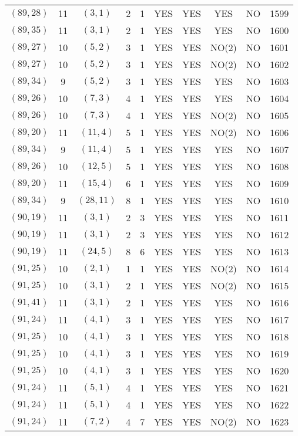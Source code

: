 \begin{longtable}{|c|c|c|c|c|c|c|c|c|c|}
$(89, 28)$ & 11 & $(3, 1)$ & 2 & 1 & YES & YES & YES & NO & 1599\\
$(89, 35)$ & 11 & $(3, 1)$ & 2 & 1 & YES & YES & YES & NO & 1600\\
$(89, 27)$ & 10 & $(5, 2)$ & 3 & 1 & YES & YES & NO(2) & NO & 1601\\
$(89, 27)$ & 10 & $(5, 2)$ & 3 & 1 & YES & YES & NO(2) & NO & 1602\\
$(89, 34)$ & 9 & $(5, 2)$ & 3 & 1 & YES & YES & YES & NO & 1603\\
$(89, 26)$ & 10 & $(7, 3)$ & 4 & 1 & YES & YES & YES & NO & 1604\\
$(89, 26)$ & 10 & $(7, 3)$ & 4 & 1 & YES & YES & NO(2) & NO & 1605\\
$(89, 20)$ & 11 & $(11, 4)$ & 5 & 1 & YES & YES & NO(2) & NO & 1606\\
$(89, 34)$ & 9 & $(11, 4)$ & 5 & 1 & YES & YES & YES & NO & 1607\\
$(89, 26)$ & 10 & $(12, 5)$ & 5 & 1 & YES & YES & YES & NO & 1608\\
$(89, 20)$ & 11 & $(15, 4)$ & 6 & 1 & YES & YES & YES & NO & 1609\\
$(89, 34)$ & 9 & $(28, 11)$ & 8 & 1 & YES & YES & YES & NO & 1610\\
$(90, 19)$ & 11 & $(3, 1)$ & 2 & 3 & YES & YES & YES & NO & 1611\\
$(90, 19)$ & 11 & $(3, 1)$ & 2 & 3 & YES & YES & YES & NO & 1612\\
$(90, 19)$ & 11 & $(24, 5)$ & 8 & 6 & YES & YES & YES & NO & 1613\\
$(91, 25)$ & 10 & $(2, 1)$ & 1 & 1 & YES & YES & NO(2) & NO & 1614\\
$(91, 25)$ & 10 & $(3, 1)$ & 2 & 1 & YES & YES & NO(2) & NO & 1615\\
$(91, 41)$ & 11 & $(3, 1)$ & 2 & 1 & YES & YES & YES & NO & 1616\\
$(91, 24)$ & 11 & $(4, 1)$ & 3 & 1 & YES & YES & YES & NO & 1617\\
$(91, 25)$ & 10 & $(4, 1)$ & 3 & 1 & YES & YES & YES & NO & 1618\\
$(91, 25)$ & 10 & $(4, 1)$ & 3 & 1 & YES & YES & YES & NO & 1619\\
$(91, 25)$ & 10 & $(4, 1)$ & 3 & 1 & YES & YES & YES & NO & 1620\\
$(91, 24)$ & 11 & $(5, 1)$ & 4 & 1 & YES & YES & YES & NO & 1621\\
$(91, 24)$ & 11 & $(5, 1)$ & 4 & 1 & YES & YES & YES & NO & 1622\\
$(91, 24)$ & 11 & $(7, 2)$ & 4 & 7 & YES & YES & NO(2) & NO & 1623\\

\end{longtable}
